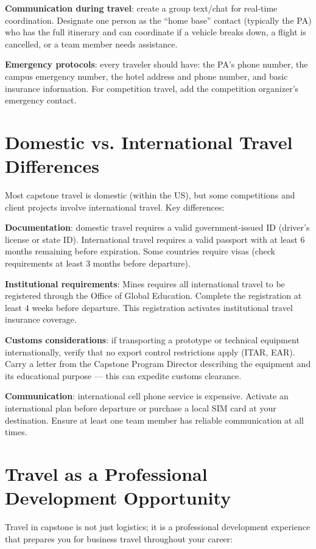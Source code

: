 \textbf{Communication during travel}: create a group text/chat for real-time coordination. Designate one person as the ``home base'' contact (typically the PA) who has the full itinerary and can coordinate if a vehicle breaks down, a flight is cancelled, or a team member needs assistance.

\textbf{Emergency protocols}: every traveler should have: the PA's phone number, the campus emergency number, the hotel address and phone number, and basic insurance information. For competition travel, add the competition organizer's emergency contact.



\section{Domestic vs. International Travel Differences}
Most capstone travel is domestic (within the US), but some competitions and client projects involve international travel. Key differences:

\textbf{Documentation}: domestic travel requires a valid government-issued ID (driver's license or state ID). International travel requires a valid passport with at least 6 months remaining before expiration. Some countries require visas (check requirements at least 3 months before departure).

\textbf{Institutional requirements}: Mines requires all international travel to be registered through the Office of Global Education. Complete the registration at least 4 weeks before departure. This registration activates institutional travel insurance coverage.

\textbf{Customs considerations}: if transporting a prototype or technical equipment internationally, verify that no export control restrictions apply (ITAR, EAR). Carry a letter from the Capstone Program Director describing the equipment and its educational purpose --- this can expedite customs clearance.

\textbf{Communication}: international cell phone service is expensive. Activate an international plan before departure or purchase a local SIM card at your destination. Ensure at least one team member has reliable communication at all times.



\section{Travel as a Professional Development Opportunity}
Travel in capstone is not just logistics; it is a professional development experience that prepares you for business travel throughout your career:

